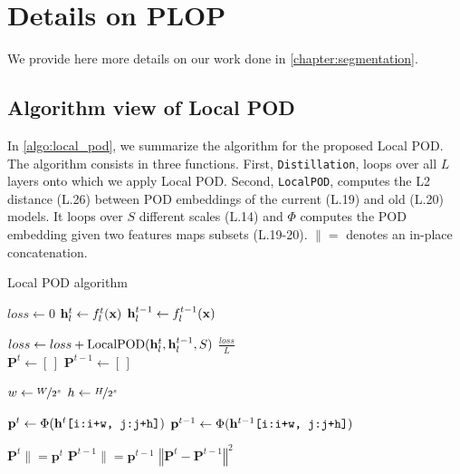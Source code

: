 \section{Details on PLOP}
\label{sec:appendix_plop}

We provide here more details on our work done in \autoref{chapter:segmentation}.

\subsection{Algorithm view of Local POD}

In \autoref{algo:local_pod}, we summarize the algorithm for the proposed Local POD. The algorithm
consists in three functions. First, \texttt{Distillation}, loops over all $L$ layers onto which we
apply Local POD. Second, \texttt{LocalPOD}, computes the L2 distance (L.26) between POD embeddings
of the current (L.19) and old (L.20) models. It loops over $S$ different scales (L.14) and $\Phi$
computes the POD embedding given two features maps subsets (L.19-20). $\|=$ denotes an in-place
concatenation.

\begin{algorithm}
    \caption{Local POD algorithm}
    \label{algo:local_pod}
    \begin{algorithmic}[1]
         \State $loss \gets 0$  \State $\mathbf{h}^t_l \gets f^t_l(\mathbf{x})$ \State $\mathbf{h}^{t-1}_l \gets
            f^{t-1}_l(\mathbf{x})$

        \State $loss \gets loss + \operatorname{LocalPOD}(\mathbf{h}^t_l, \mathbf{h}^{t-1}_l, S)$ \EndFor \State
        \Return $\frac{loss}{L}$ \EndFunction \\
         \State $\mathbf{P}^t \gets [\,]$ \State
        $\mathbf{P}^{t-1} \gets [\,]$

          \State $w \gets
            \nicefrac{W}{2^s}$ \State $h \gets \nicefrac{H}{2^s}$

          \State $\mathbf{p}^t \gets \operatorname{\Phi}(\mathbf{h}^t\texttt{[i:i+w, j:j+h]})$
        \State $\mathbf{p}^{t-1} \gets \operatorname{\Phi}(\mathbf{h}^{t-1}\texttt{[i:i+w,
                j:j+h]})$

        \State $\mathbf{P}^t \|= \mathbf{p}^t$ \State $\mathbf{P}^{t-1} \|= \mathbf{p}^{t-1}$ \EndFor \EndFor
        \EndFor \State \Return $\left\Vert \mathbf{P}^t - \mathbf{P}^{t-1}\right\Vert^2$
        \EndFunction
    \end{algorithmic}
\end{algorithm}

